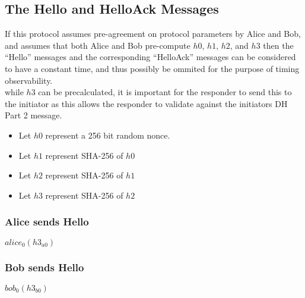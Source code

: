 \documentclass[11pt]{article}
\begin{document}
  \subsection{The Hello and HelloAck Messages}
  If this protocol assumes pre-agreement on protocol parameters
  by Alice and Bob, and assumes that both Alice and Bob pre-compute
  $h0$, $h1$, $h2$, and $h3$ then the ``Hello'' messages and the 
  corresponding ``HelloAck'' messages can be considered to have
  a constant time, and thus possibly be ommited for the purpose of
  timing observability. \\
  while $h3$ can be precalculated, it is important for the responder
  to send this to the initiator as this allows the responder to validate
  against the initiators DH Part 2 message.
  \begin{itemize}
    \item Let $h0$ represent a 256 bit random nonce.
    \item Let $h1$ represent SHA-256 of $h0$
    \item Let $h2$ represent SHA-256 of $h1$
    \item Let $h3$ represent SHA-256 of $h2$
  \end{itemize}
  \subsubsection{Alice sends Hello}
  $alice_0(h3_{a0})$
  \subsubsection{Bob sends Hello}
  $bob_0(h3_{b0})$
\end{document}
